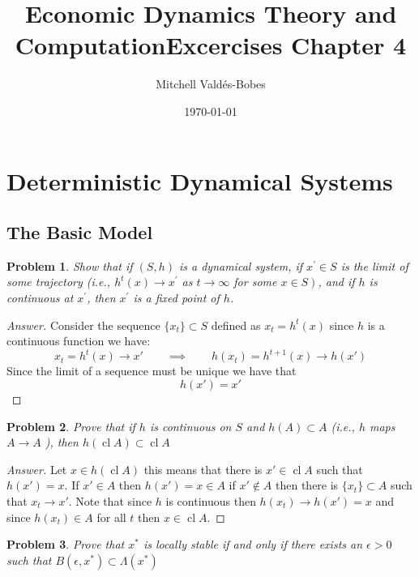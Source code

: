 \documentclass{article}
\title{Economic Dynamics Theory and Computation\newline Excercises Chapter 4}
\author{Mitchell Valdés-Bobes}
\date{\today}
\newtheorem{problem}{Problem}[section]
\newcommand{\qiq}{\qquad \implies \qquad}
\begin{document}
\maketitle
\section{Deterministic Dynamical Systems}

\subsection{The Basic Model}

\begin{problem}\label{problem_1}
    Show that if $(S, h)$ is a dynamical system, if $x^{\prime} \in S$ is the limit of some trajectory (i.e., $h^{t}(x) \rightarrow x^{\prime}$ as $t \rightarrow \infty$ for some $\left.x \in S\right)$, and if $h$ is continuous at $x^{\prime}$, then $x^{\prime}$ is a fixed point of $h$.    
\end{problem}

\begin{proof}[Answer]
    Consider the sequence $\{x_t\}\subset S$ defined as $x_t = h^t(x)$ since $h$ is a continuous function we have:
    $$x_t = h^t(x) \to x' \qiq h(x_t) = h^{t+1}(x) \to h(x')$$
    Since the limit of a sequence must be unique we have that
    $$\boxed{h(x')=x'}$$
\end{proof}

\begin{problem}
    Prove that if $h$ is continuous on $S$ and $h(A) \subset A$ (i.e., $h$ maps $A \rightarrow A$ ), then $h(\operatorname{cl} A) \subset \operatorname{cl} A$
\end{problem}

\begin{proof}[Answer]
    Let $x\in h(\operatorname{cl}A)$ this means that there is $x'\in \operatorname{cl}A$ such that $h(x')=x$. If $x'\in A$ then $h(x')=x\in A$ if $x'\not\in A$ then there is $\{x_t\}\subset A$ such that $x_t\to x'$. Note that since $h$ is continuous then $h(x_t)\to h(x')=x$ and since $h(x_t)\in A$ for all $t$ then $x\in \operatorname{cl}A$.
\end{proof}

\begin{problem}
    Prove that $x^{*}$ is locally stable if and only if there exists an $\epsilon>0$ such that $B\left(\epsilon, x^{*}\right) \subset \Lambda\left(x^{*}\right)$
\end{problem}
\end{document}
